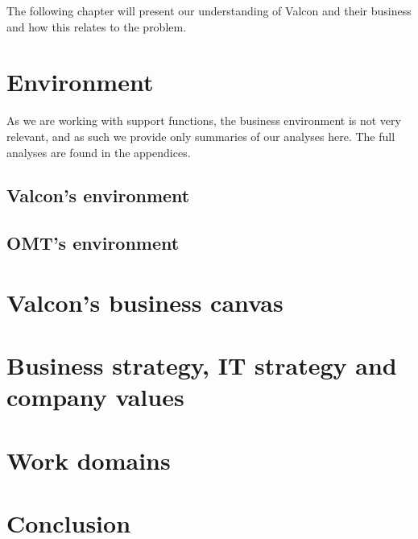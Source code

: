 The following chapter will present our understanding of Valcon and their business and how this relates to the problem. 

\section{Environment}
As we are working with support functions, the business environment is not very relevant, and as such we provide only summaries of our analyses here.
The full analyses are found in the appendices.
\subsection{Valcon's environment}

\subsection{OMT's environment}

\section{Valcon's business canvas}

\section{Business strategy, IT strategy and company values}

\section{Work domains}

\section{Conclusion}
